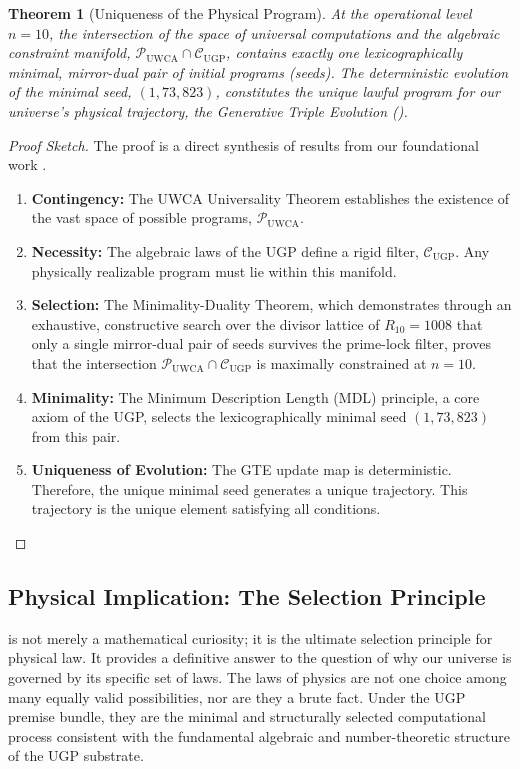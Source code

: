 \documentclass[12pt]{article}
\newtheorem{theorem}{Theorem}[section]
\newcommand{\UGP}{\text{UGP}}
\newcommand{\GTE}{\text{GTE}}
\newcommand{\UWCA}{\text{UWCA}}
\newcommand{\scP}{\mathscr{P}}
\newcommand{\scC}{\mathscr{C}}
\begin{document}
\begin{theorem}[Uniqueness of the Physical Program]
\label{thm:uniqueness_of_program}
At the operational level $n=10$, the intersection of the space of universal computations and the algebraic constraint manifold, $\scP_{\UWCA} \cap \scC_{\UGP}$, contains exactly one lexicographically minimal, mirror-dual pair of initial programs (seeds). The deterministic evolution of the minimal seed, $(1, 73, 823)$, constitutes the unique lawful program for our universe's physical trajectory, the Generative Triple Evolution (\GTE).
\end{theorem}
\begin{proof}[Proof Sketch]
The proof is a direct synthesis of results from our foundational work \cite{Spivack2025UGP}.
\begin{enumerate}[leftmargin=*, itemsep=0.2em]
    \item \textbf{Contingency:} The UWCA Universality Theorem establishes the existence of the vast space of possible programs, $\scP_{\UWCA}$.
    \item \textbf{Necessity:} The algebraic laws of the UGP define a rigid filter, $\scC_{\UGP}$. Any physically realizable program must lie within this manifold.
    \item \textbf{Selection:} The Minimality-Duality Theorem, which demonstrates through an exhaustive, constructive search over the divisor lattice of $R_{10}=1008$ that only a single mirror-dual pair of seeds survives the prime-lock filter, proves that the intersection $\scP_{\UWCA} \cap \scC_{\UGP}$ is maximally constrained at $n=10$.
    \item \textbf{Minimality:} The Minimum Description Length (MDL) principle, a core axiom of the UGP, selects the lexicographically minimal seed $(1, 73, 823)$ from this pair.
    \item \textbf{Uniqueness of Evolution:} The GTE update map is deterministic. Therefore, the unique minimal seed generates a unique trajectory. This trajectory is the unique element satisfying all conditions. \qedhere
\end{enumerate}
\end{proof}

\subsection{Physical Implication: The Selection Principle}
 is not merely a mathematical curiosity; it is the ultimate selection principle for physical law. It provides a definitive answer to the question of why our universe is governed by its specific set of laws. The laws of physics are not one choice among many equally valid possibilities, nor are they a brute fact. Under the UGP premise bundle, they are the minimal and structurally selected computational process consistent with the fundamental algebraic and number-theoretic structure of the UGP substrate.
\end{document}
